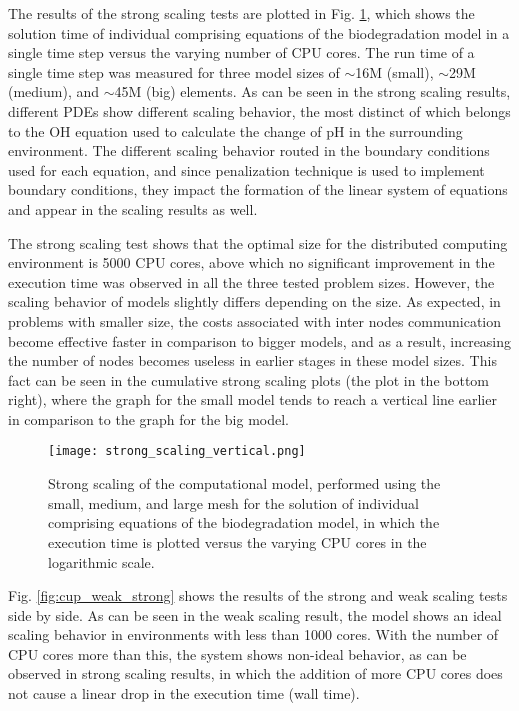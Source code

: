 The results of the strong scaling tests are plotted in Fig. \ref{fig:cup_strong_scaling}, which shows the solution time of individual comprising equations of the biodegradation model in a single time step versus the varying number of CPU cores. The run time of a single time step was measured for three model sizes of $\sim$16M (small), $\sim$29M (medium), and $\sim$45M (big) elements. As can be seen in the strong scaling results, different PDEs show different scaling behavior, the most distinct of which belongs to the OH equation used to calculate the change of pH in the surrounding environment. The different scaling behavior routed in the boundary conditions used for each equation, and since penalization technique is used to implement boundary conditions, they impact the formation of the linear system of equations and appear in the scaling results as well.

The strong scaling test shows that the optimal size for the distributed computing environment is \num{5000} CPU cores, above which no significant improvement in the execution time was observed in all the three tested problem sizes. However, the scaling behavior of models slightly differs depending on the size. As expected, in problems with smaller size, the costs associated with inter nodes communication become effective faster in comparison to bigger models, and as a result, increasing the number of nodes becomes useless in earlier stages in these model sizes. This fact can be seen in the cumulative strong scaling plots (the plot in the bottom right), where the graph for the small model tends to reach a vertical line earlier in comparison to the graph for the big model.

\begin{figure}[h]
\centering
\medskip
\texttt{[image: strong\_scaling\_vertical.png]}
\caption[Strong scaling of individual components of the biodegradation model]{Strong scaling of the computational model, performed using the small, medium, and large mesh for the solution of individual comprising equations of the biodegradation model, in which the execution time is plotted versus the varying CPU cores in the logarithmic scale.} \label{fig:cup_strong_scaling}
\end{figure}

Fig. \ref{fig:cup_weak_strong} shows the results of the strong and weak scaling tests side by side. As can be seen in the weak scaling result, the model shows an ideal scaling behavior in environments with less than \num{1000} cores. With the number of CPU cores more than this, the system shows non-ideal behavior, as can be observed in strong scaling results, in which the addition of more CPU cores does not cause a linear drop in the execution time (wall time). 

